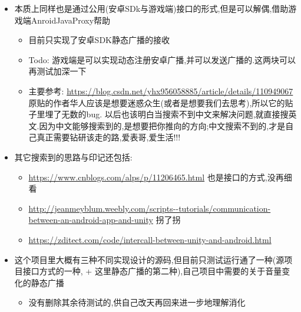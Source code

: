 \documentclass[9pt, b5paper]{article}
\begin{document}
\begin{itemize}
\item 本质上同样也是通过公用(安卓SDk与游戏端)接口的形式,但是可以解偶,借助游戏端AnroidJavaProxy帮助
\begin{itemize}
\item 目前只实现了安卓SDK静态广播的接收
\item Todo: 游戏端是可以实现动态注册安卓广播,并可以发送广播的.这两块可以再测试加深一下
\item 主要参考: \url{https://blog.csdn.net/yhx956058885/article/details/110949067} 原贴的作者华人应该是想要迷惑众生(或者是想要我们去思考),所以它的贴子里埋了无数的bug. 以后也该明白当搜索不到中文来解决问题,就直接搜英文.因为中文能够搜索到的,是想要把你推向的方向;中文搜索不到的,才是自己真正需要钻研该走的路,爱表哥,爱生活!!!
\end{itemize}
\item 其它搜索到的思路与印记还包括:
\begin{itemize}
\item \url{https://www.cnblogs.com/alps/p/11206465.html} 也是接口的方式,没再细看
\item \url{http://jeanmeyblum.weebly.com/scripts--tutorials/communication-between-an-android-app-and-unity} 拐了拐
\item \url{https://zditect.com/code/intercall-between-unity-and-android.html}
\end{itemize}

\item 这个项目里大概有三种不同实现设计的源码,但目前只测试运行通了一种(源项目接口方式的一种, + 这里静态广播的第二种),自己项目中需要的关于音量变化的静态广播
\begin{itemize}
\item 没有删除其余待测试的,供自己改天再回来进一步地理解消化
\end{itemize}
\end{itemize}
\end{document}
